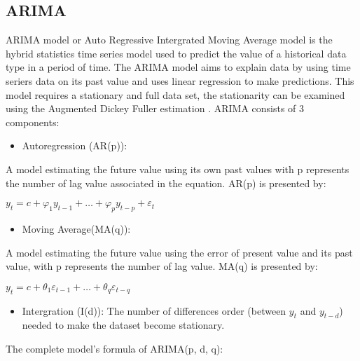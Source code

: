 \documentclass{ieeeojies}
\begin{document}
\subsection{ARIMA}
\hspace{0.4cm}ARIMA model or Auto Regressive Intergrated Moving Average model is the hybrid statistics time series model used to predict the value of a historical data type in a period of time. The ARIMA model aims to explain data by using time seriers data on its past value and uses linear regression to make predictions. This model requires a stationary and full data set, the stationarity can be examined using the Augmented Dickey Fuller estimation \cite{arima1}. 
ARIMA consists of 3 components:
 \begin{itemize}
     \item Autoregression (AR(p)): 
 \end{itemize}
	\hspace{0.4cm}      A model estimating the future value using its own past values with p represents the number of lag value associated in the equation. AR(p) is presented by: \newline
 
 $y_t=c+\varphi_1y_{t-1}+\ldots+\varphi_py_{t-p}+\varepsilon_t$ \newline

	
 \begin{itemize}
     \item Moving Average(MA(q)):
 \end{itemize}
\newline 
\hspace{0.4cm}A model estimating the future value using the error of present value and its past value, with p represents the number of lag value. MA(q) is presented by: \newline

 $y_t=c+\theta_1\varepsilon_{t-1}+\ldots+\theta_q\varepsilon_{t-q}$ \newline

 \begin{itemize}
     \item Intergration (I(d)): The number of differences order (between $y_t$ and $y_{t-d}$) needed to make the dataset become stationary.
 \end{itemize}
 \newline 

\hspace{0.4cm}The complete model’s formula of ARIMA(p, d, q):\newline
\end{document}
